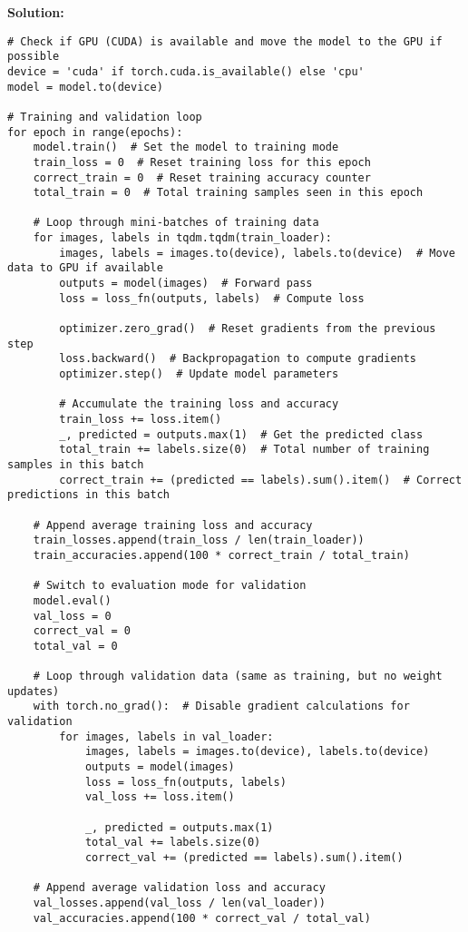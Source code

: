 \documentclass{article}
\newenvironment{solution}{\color{blue} \smallskip \textbf{Solution:}}{}
\begin{document}
\begin{solution}
\begin{verbatim}
# Check if GPU (CUDA) is available and move the model to the GPU if possible
device = 'cuda' if torch.cuda.is_available() else 'cpu'
model = model.to(device)

# Training and validation loop
for epoch in range(epochs):
    model.train()  # Set the model to training mode
    train_loss = 0  # Reset training loss for this epoch
    correct_train = 0  # Reset training accuracy counter
    total_train = 0  # Total training samples seen in this epoch

    # Loop through mini-batches of training data
    for images, labels in tqdm.tqdm(train_loader):
        images, labels = images.to(device), labels.to(device)  # Move data to GPU if available
        outputs = model(images)  # Forward pass
        loss = loss_fn(outputs, labels)  # Compute loss
        
        optimizer.zero_grad()  # Reset gradients from the previous step
        loss.backward()  # Backpropagation to compute gradients
        optimizer.step()  # Update model parameters

        # Accumulate the training loss and accuracy
        train_loss += loss.item()
        _, predicted = outputs.max(1)  # Get the predicted class
        total_train += labels.size(0)  # Total number of training samples in this batch
        correct_train += (predicted == labels).sum().item()  # Correct predictions in this batch

    # Append average training loss and accuracy
    train_losses.append(train_loss / len(train_loader))
    train_accuracies.append(100 * correct_train / total_train)

    # Switch to evaluation mode for validation
    model.eval()
    val_loss = 0
    correct_val = 0
    total_val = 0

    # Loop through validation data (same as training, but no weight updates)
    with torch.no_grad():  # Disable gradient calculations for validation
        for images, labels in val_loader:
            images, labels = images.to(device), labels.to(device)
            outputs = model(images)
            loss = loss_fn(outputs, labels)
            val_loss += loss.item()

            _, predicted = outputs.max(1)
            total_val += labels.size(0)
            correct_val += (predicted == labels).sum().item()

    # Append average validation loss and accuracy
    val_losses.append(val_loss / len(val_loader))
    val_accuracies.append(100 * correct_val / total_val)


\end{verbatim}
\end{solution}
\end{document}
